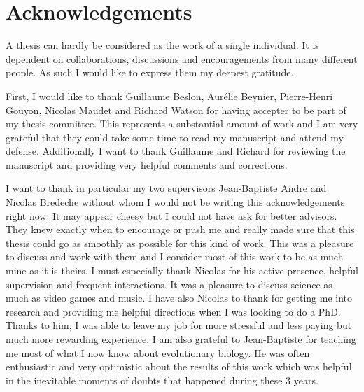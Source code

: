 \chapter*{Acknowledgements}


A thesis can hardly be considered as the work of a single individual. It is dependent on collaborations, discussions and encouragements from many different people. As such I would like to express them my deepest gratitude.

First, I would like to thank Guillaume Beslon, Aurélie Beynier, Pierre-Henri Gouyon, Nicolas Maudet and Richard Watson for having accepter to be part of my thesis committee. This represents a substantial amount of work and I am very grateful that they could take some time to read my manuscript and attend my defense. Additionally I want to thank Guillaume and Richard for reviewing the manuscript and providing very helpful comments and corrections.

I want to thank in particular my two supervisors Jean-Baptiste Andre and Nicolas Bredeche without whom I would not be writing this acknowledgements right now. It may appear cheesy but I could not have ask for better advisors. They knew exactly when to encourage or push me and really made sure that this thesis could go as smoothly as possible for this kind of work. This was a pleasure to discuss and work with them and I consider most of this work to be as much mine as it is theirs. I must especially thank Nicolas for his active presence, helpful supervision and frequent interactions. It was a pleasure to discuss science as much as video games and music. I have also Nicolas to thank for getting me into research and providing me helpful directions when I was looking to do a PhD. Thanks to him, I was able to leave my job for more stressful and less paying but much more rewarding experience. I am also grateful to Jean-Baptiste for teaching me most of what I now know about evolutionary biology. He was often enthusiastic and very optimistic about the results of this work which was helpful in the inevitable moments of doubts that happened during these 3 years.

